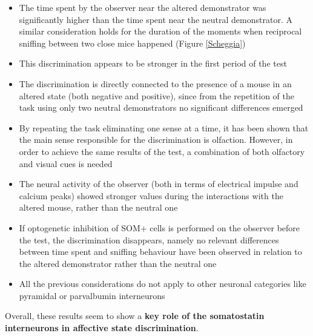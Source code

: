 \documentclass[12pt, a4paper]{report}
\begin{document}
 \begin{itemize}
 	
 	\item The time spent by the observer near the altered demonstrator was significantly higher than the time spent near the neutral demonstrator. A similar consideration holds for the duration of the moments when reciprocal sniffing between two close mice happened (Figure \ref{Scheggia})
 	
 	\item This  discrimination appears to be stronger in the first period of the test
 	
 	\item The discrimination is directly connected to the presence of a mouse in an altered state (both negative and positive), since from the repetition of the task using only two neutral demonstrators no significant differences emerged
 	
 	\item By repeating the task eliminating one sense at a time, it has been shown that the main sense responsible for the discrimination is olfaction. However, in order to achieve the same results of the test, a combination of both olfactory and visual cues is needed
 	
 	
 	\item The neural activity of the observer (both in terms of electrical impulse and  calcium peaks) showed stronger values during the interactions with the altered mouse, rather than the neutral one
 	
 	\item If optogenetic inhibition of SOM+ cells \cite{41} is
 	performed on the observer before the test, the discrimination disappears, namely no relevant differences between time spent and sniffing behaviour have been observed in relation to the altered demonstrator rather than the neutral one
 	
 	
 	\item All the previous considerations do not apply to other neuronal categories like pyramidal or parvalbumin interneurons
 	 
 \end{itemize}
 
 Overall, these results seem to show a \textbf{key role of the somatostatin interneurons in affective state discrimination}.
\end{document}
